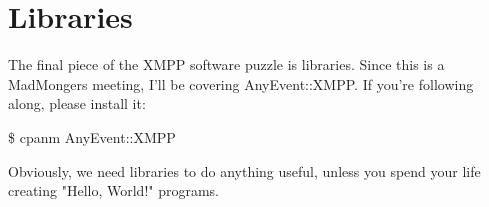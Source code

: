 \section{Libraries}

\pause
The final piece of the XMPP software puzzle is libraries.  Since this is a MadMongers meeting, I'll be covering AnyEvent::XMPP.
If you're following along, please install it:

\begin{shaded}
\$ cpanm AnyEvent::XMPP
\end{shaded}

\pause

Obviously, we need libraries to do anything useful, unless you spend your life creating "Hello, World!" programs.
